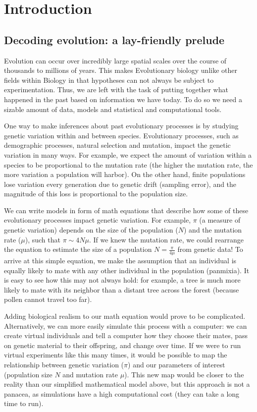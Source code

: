 \chapter{Introduction}

\section{Decoding evolution: a lay-friendly prelude}
Evolution can occur over incredibly large spatial scales over the course of thousands to millions of years.
This makes Evolutionary biology unlike other fields within Biology in that hypotheses can not always be subject to experimentation.
Thus, we are left with the task of putting together what happened in the past based on information we have today.
To do so we need a sizable amount of data, models and statistical and computational tools.

One way to make inferences about past evolutionary processes is by studying genetic variation within and between species.
Evolutionary processes, such as demographic processes, natural selection and mutation, impact the genetic variation in many ways.
For example, we expect the amount of variation within a species to be proportional to the mutation rate (\ie the higher the mutation rate, the more variation a population will harbor).
On the other hand, finite populations lose variation every generation due to genetic drift (\ie sampling error), 
and the magnitude of this loss is proportional to the population size.

We can write models in form of math equations that describe how some of these evolutionary processes impact genetic variation.
For example, $\pi$ (a measure of genetic variation) depends on the size of the population ($N$) and the mutation rate ($\mu$), such that $\pi \sim 4N\mu$.
If we knew the mutation rate, we could rearrange the equation to estimate the size of a population $N = \frac{\pi}{4\mu}$ from genetic data!
To arrive at this simple equation, we make the assumption that an individual is equally likely to mate with any other individual in the population (\ie panmixia).
It is easy to see how this may not always hold:
for example, a tree is much more likely to mate with its neighbor than a distant tree across the forest (because pollen cannot travel too far).

Adding biological realism to our math equation would prove to be complicated.
Alternatively, we can more easily simulate this process with a computer:
we can create virtual individuals and tell a computer how they choose their mates, pass on genetic material to their offspring, and change over time.
If we were to run virtual experiments like this many times,
it would be possible to map the relationship between genetic variation ($\pi$) and our parameters of interest (population size $N$ and mutation rate $\mu$).
This new map would be closer to the reality than our simplified mathematical model above,
but this approach is not a panacea, as simulations have a high computational cost (\ie they can take a long time to run).

